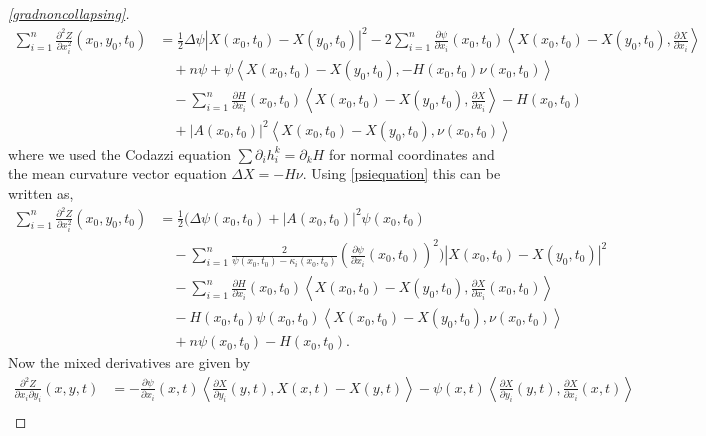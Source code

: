 \begin{proof}[\cref{gradnoncollapsing}]
    \begin{align}
        \sum_{i=1}^{n} \frac{\partial^{2}Z}{\partial x_{i}^{2}}(x_{0},y_{0},t_{0}) & = \frac{1}{2} \Delta \psi |X(x_{0},t_{0})- X(y_{0},t_{0})|^{2} - 2 \sum_{i=1}^{n} \frac{\partial \psi}{\partial x_{i}}(x_{0},t_{0})\left< X(x_{0},t_{0})-X(y_{0},t_{0}), \frac{\partial X}{\partial x_{i}} \right> \nonumber\\ 
        & \quad + n \psi + \psi\left<X(x_{0},t_{0})-X(y_{0},t_{0}), -H(x_{0},t_{0})\nu(x_{0},t_{0})  \right> \nonumber\\
        & \quad - \sum_{i=1}^{n} \frac{\partial H}{\partial x_{i}}(x_{0},t_{0})\left< X(x_{0},t_{0})-X(y_{0},t_{0}), \frac{\partial X}{\partial x_{i}} \right>- H(x_{0},t_{0})\nonumber \\
        & \quad + |A(x_{0},t_{0})|^{2}\left< X(x_{0},t_{0})-X(y_{0},t_{0}), \nu(x_{0},t_{0}) \right>
    \end{align}
    where we used the Codazzi equation $ \sum \partial_{i}h_{i}^{k} = \partial_{k}H $ for normal coordinates and the mean curvature vector equation $ \Delta X = -H \nu $. Using  \cref{psiequation} this can be written as, \begin{align}
        \sum_{i=1}^{n} \frac{\partial^{2}Z}{\partial x_{i}^{2}}(x_{0},y_{0},t_{0}) & = \frac{1}{2} \bigg( \Delta \psi(x_{0},t_{0}) + |A(x_{0},t_{0})|^{2}\psi(x_{0},t_{0}) \nonumber \\
        & \quad- \sum_{i=1}^{n} \frac{2}{\psi(x_{0},t_{0})- \kappa_{i}(x_{0},t_{0})}\left( \frac{\partial \psi}{\partial x_{i}}(x_{0},t_{0}) \right)^{2} \bigg)|X(x_{0},t_{0})-X(y_{0},t_{0})|^{2} \nonumber \\
        & \quad - \sum_{i=1}^{n} \frac{\partial H}{\partial x_{i}}(x_{0},t_{0}) \left< X(x_{0},t_{0})-X(y_{0},t_{0}), \frac{\partial X}{\partial x_{i}}(x_{0},t_{0}) \right> \nonumber \\
        & \quad - H(x_{0},t_{0})\psi(x_{0},t_{0})\left< X(x_{0},t_{0})-X(y_{0},t_{0}), \nu(x_{0},t_{0}) \right>\nonumber \\
        & \quad + n \psi(x_{0},t_{0}) - H(x_{0},t_{0}).
    \end{align}
    Now the mixed derivatives are given by
    \begin{align*}
        \frac{\partial^{2} Z}{\partial x_{i}\partial y_{i}}(x,y,t) & = - \frac{\partial \psi}{\partial x_{i}}(x,t)\left< \frac{\partial X}{\partial y_{i}}(y,t), X(x,t)-X(y,t) \right> - \psi(x,t)\left<  \frac{\partial X}{\partial y_{i}}(y,t), \frac{\partial X}{\partial x_{i}}(x,t) \right> \nonumber \\

\end{align*}
\end{proof}
